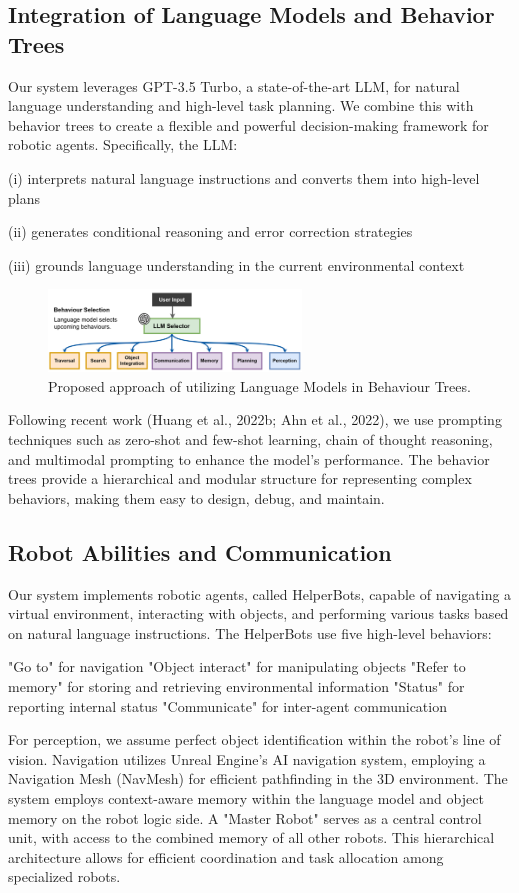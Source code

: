 \documentclass[pdflatex,sn-mathphys-num]{sn-jnl}%
\theoremstyle{thmstyleone}%
\theoremstyle{thmstyletwo}%
\theoremstyle{thmstylethree}%
\begin{document}
\subsection{Integration of Language Models and Behavior Trees}
Our system leverages GPT-3.5 Turbo, a state-of-the-art LLM, for natural language understanding and high-level task planning. We combine this with behavior trees to create a flexible and powerful decision-making framework for robotic agents. Specifically, the LLM:

(i) interprets natural language instructions and converts them into high-level plans

(ii) generates conditional reasoning and error correction strategies

(iii) grounds language understanding in the current environmental context

\begin{figure}[H]
\centering
\includegraphics[width=0.6\textwidth]{figures/Picture12.png}
\caption{Proposed approach of utilizing Language Models in Behaviour Trees.}\label{fig7}
\end{figure}
Following recent work (Huang et al., 2022b; Ahn et al., 2022), we use prompting techniques such as zero-shot and few-shot learning, chain of thought reasoning, and multimodal prompting to enhance the model's performance. The behavior trees provide a hierarchical and modular structure for representing complex behaviors, making them easy to design, debug, and maintain.
\subsection{Robot Abilities and Communication}
Our system implements robotic agents, called HelperBots, capable of navigating a virtual environment, interacting with objects, and performing various tasks based on natural language instructions. The HelperBots use five high-level behaviors:

"Go to" for navigation
"Object interact" for manipulating objects
"Refer to memory" for storing and retrieving environmental information
"Status" for reporting internal status
"Communicate" for inter-agent communication

For perception, we assume perfect object identification within the robot's line of vision. Navigation utilizes Unreal Engine's AI navigation system, employing a Navigation Mesh (NavMesh) for efficient pathfinding in the 3D environment.
The system employs context-aware memory within the language model and object memory on the robot logic side. A "Master Robot" serves as a central control unit, with access to the combined memory of all other robots. This hierarchical architecture allows for efficient coordination and task allocation among specialized robots.
\end{document}
